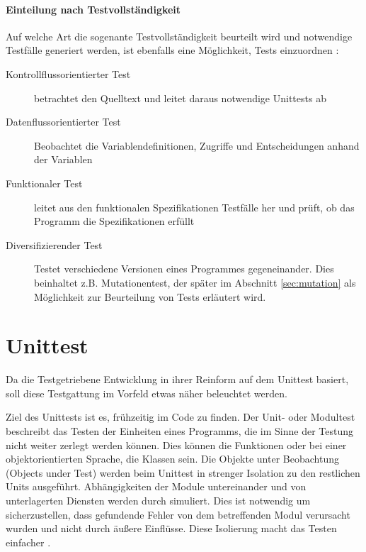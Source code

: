 \paragraph{Einteilung nach Testvollständigkeit} Auf welche Art die sogenante Testvollständigkeit beurteilt wird und notwendige Testfälle generiert werden, ist ebenfalls eine Möglichkeit, Tests einzuordnen \citep{liggesmeyer_modultest_1990}:
\begin{description}
 \item[Kontrollflussorientierter Test] betrachtet den Quelltext und leitet daraus notwendige Unittests ab
 \item[Datenflussorientierter Test] Beobachtet die Variablendefinitionen, Zugriffe und Entscheidungen anhand der Variablen
 \item[Funktionaler Test] leitet aus den funktionalen Spezifikationen Testfälle her und prüft, ob das Programm die Spezifikationen erfüllt
 \item[Diversifizierender Test] Testet verschiedene Versionen eines Programmes gegeneinander. Dies beinhaltet z.B. Mutationentest, der später im Abschnitt \ref{sec:mutation} \textit{} als Möglichkeit zur Beurteilung von Tests erläutert wird.
\end{description}
\section{Unittest}
\label{sec:testUnit}
Da die Testgetriebene Entwicklung in ihrer Reinform auf dem Unittest basiert, soll diese Testgattung im Vorfeld etwas näher beleuchtet werden.

Ziel des Unittests ist es, frühzeitig  im Code zu finden. Der Unit- oder Modultest beschreibt das Testen der Einheiten eines Programms, die im Sinne der Testung nicht weiter zerlegt werden können. Dies können die Funktionen oder bei einer objektorientierten Sprache, die Klassen sein. Die Objekte unter Beobachtung (Objects under Test) werden beim Unittest in strenger Isolation zu den restlichen Units ausgeführt. Abhängigkeiten der Module untereinander und von unterlagerten Diensten werden durch  simuliert. Dies ist notwendig um sicherzustellen, dass gefundende Fehler von dem betreffenden Modul verursacht wurden und nicht durch äußere Einflüsse. Diese Isolierung macht das Testen einfacher \citep{goodliffe_code_2006,liggesmeyer_modultest_1990}.



